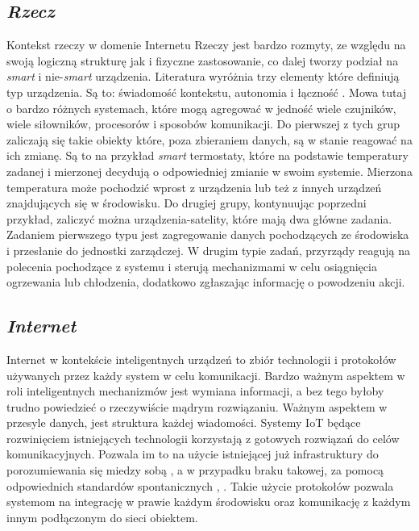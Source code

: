 \subsection{\textit{Rzecz}}
Kontekst rzeczy w domenie Internetu Rzeczy jest bardzo rozmyty, ze względu na swoją logiczną strukturę jak i fizyczne zastosowanie, co dalej tworzy podział na \textit{smart} i nie-\textit{smart} urządzenia. Literatura wyróżnia trzy elementy które definiują typ urządzenia. Są to: świadomość kontekstu, autonomia i łączność \cite{smart_dumb_devices}. Mowa tutaj o bardzo różnych systemach, które mogą agregować w jedność wiele czujników, wiele siłowników, procesorów i sposobów komunikacji. Do pierwszej z tych grup zaliczają się takie obiekty które, poza zbieraniem danych, są w stanie reagować na ich zmianę. Są to na przykład \textit{smart} termostaty, które na podstawie temperatury zadanej i mierzonej decydują o odpowiedniej zmianie w swoim systemie. Mierzona temperatura może pochodzić wprost z urządzenia lub też z innych urządzeń znajdujących się w środowisku. Do drugiej grupy, kontynuując poprzedni przykład, zaliczyć można urządzenia-satelity, które mają dwa główne zadania. Zadaniem pierwszego typu jest zagregowanie danych pochodzących ze środowiska i przesłanie do jednostki zarządczej. W drugim typie zadań, przyrządy reagują na polecenia pochodzące z systemu i sterują mechanizmami w celu osiągnięcia ogrzewania lub chłodzenia, dodatkowo zgłaszając informację o powodzeniu akcji.


\subsection{\textit{Internet}}
Internet w kontekście inteligentnych urządzeń to zbiór technologii i protokołów używanych przez każdy system w celu komunikacji. Bardzo ważnym aspektem w roli inteligentnych mechanizmów jest wymiana informacji, a bez tego byłoby trudno powiedzieć o rzeczywiście mądrym rozwiązaniu. Ważnym aspektem w przesyle danych, jest struktura każdej wiadomości. Systemy IoT będące rozwinięciem istniejących technologii korzystają z gotowych rozwiązań do celów komunikacyjnych. Pozwala im to na użycie istniejącej już infrastruktury do porozumiewania się miedzy sobą  \cite{rfc791}, a w przypadku braku takowej, za pomocą odpowiednich standardów spontanicznych \cite{spontaneous_networking}, \cite{spontaneous_wireless_networking}. Takie użycie protokołów pozwala systemom na integrację w prawie każdym środowisku oraz komunikację z każdym innym podłączonym do sieci obiektem.



